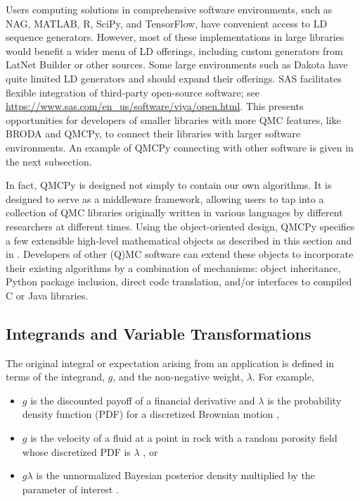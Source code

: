 \documentclass[graybox]{svmult}
\begin{document}
Users computing solutions in comprehensive software environments, such as NAG, MATLAB, R, SciPy, and TensorFlow, have convenient access to LD sequence generators.  However, most of these implementations in large libraries would benefit a wider menu of LD offerings, including custom generators from LatNet Builder or other sources.  Some large environments such as  Dakota \cite{DakotaUsersManual} have quite limited LD generators and should expand their offerings. SAS facilitates flexible integration of third-party open-source software; see \href{https://www.sas.com/en_us/software/viya/open.html}{\url{https://www.sas.com/en_us/software/viya/open.html}}.
This presents opportunities for developers of smaller libraries with more QMC features, like BRODA and QMCPy, to connect their libraries with larger software environments. An example of QMCPy connecting with other software is given in the next subsection.

In fact, QMCPy is designed not simply to contain our own algorithms.  It is designed to serve as a middleware framework, allowing users to tap into a collection of QMC libraries originally written in various languages by different researchers at different times. Using the object-oriented design, QMCPy specifies a few  extensible high-level mathematical objects as described in this section and in \cite{ChoEtal22a}. Developers of other (Q)MC software can  extend these objects to incorporate their existing algorithms by a combination of mechanisms: object inheritance, Python package inclusion, direct code translation, and/or interfaces to compiled C or Java libraries.


\subsection{Integrands and Variable Transformations} \label{CDHJS:sec:integrands}
The original integral or expectation arising from an application is defined in terms of the integrand, $g$, and the non-negative weight, $\lambda$.  For example,
\begin{itemize}
	\item $g$ is the discounted payoff of a financial derivative and $\lambda$ is the probability density function (PDF) for a discretized Brownian motion \cite{Gla03},

	\item  $g$ is the velocity of a fluid at a point in rock with a random porosity field whose discretized PDF is $\lambda$ \cite{KuoNuy16a}, or

	\item $g\lambda$ is the unnormalized Bayesian posterior density multiplied by the parameter of interest \cite{GelEtal13}.
\end{itemize}
\end{document}
